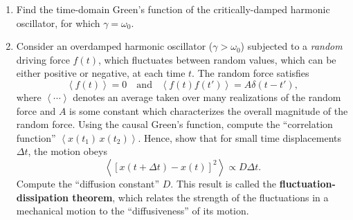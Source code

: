 \documentclass[10pt,a4paper]{article}
\begin{document}
\begin{enumerate}
\item 
Find the time-domain Green's function of the critically-damped harmonic
oscillator, for which $\gamma = \omega_0$.

\item
Consider an overdamped harmonic oscillator ($\gamma > \omega_0$)
subjected to a \emph{random} driving force $f(t)$, which fluctuates
between random values, which can be either positive or negative, at each
time $t$. The random force satisfies
\begin{equation}
\left\langle f(t)\right\rangle = 0 \quad\mathrm{and}\;\;\;\left\langle f(t) f(t')\right\rangle = A \delta(t-t'),
\end{equation}
where $\left\langle\cdots\right\rangle$ denotes an average taken over
many realizations of the random force and $A$ is some constant which
characterizes the overall magnitude of the random force. Using the
causal Green's function, compute the ``correlation function''
$\left\langle x(t_1)\, x(t_2) \right\rangle$. Hence, show that for
small time displacements $\Delta t$, the motion obeys
\begin{equation}
\left\langle [x(t+\Delta t) - x(t)]^2 \right\rangle \propto D \Delta t.
\end{equation}
Compute the ``diffusion constant'' $D$. This result is called the
\textbf{fluctuation-dissipation theorem}, which relates the strength of
the fluctuations in a mechanical motion to the ``diffusiveness'' of its
motion.
\end{enumerate}
\end{document}
